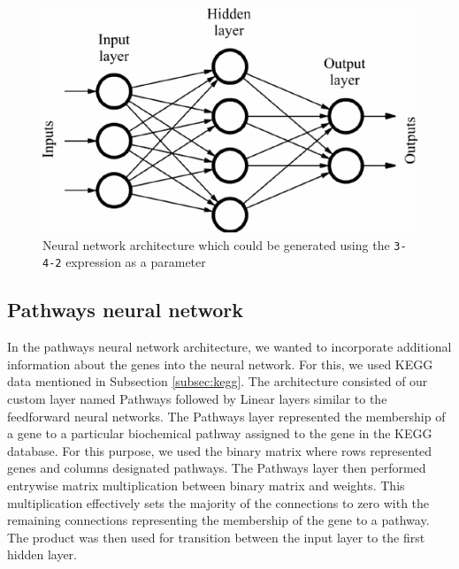 \begin{figure}
    \centering
    \includegraphics[width=0.7\linewidth]{images/ff_nn.png}
    \caption[Neural network - example]{Neural network architecture which could be generated using the \texttt{3-4-2} expression as a parameter}
    \label{fig:ff_nn}
\end{figure}

\subsection{Pathways neural network}
In the pathways neural network architecture, we wanted to incorporate additional information about the genes into the neural network.
For this, we used KEGG data mentioned in Subsection \ref{subsec:kegg}.
The architecture consisted of our custom layer named Pathways followed by Linear layers similar to the feedforward neural networks.
The Pathways layer represented the membership of a gene to a particular biochemical pathway assigned to the gene in the KEGG database.
For this purpose, we used the binary matrix where rows represented genes and columns designated pathways.
The Pathways layer then performed entrywise matrix multiplication between binary matrix and weights.
This multiplication effectively sets the majority of the connections to zero with the remaining connections representing the membership of the gene to a pathway.
The product was then used for transition between the input layer to the first hidden layer.

